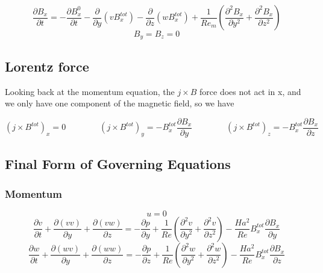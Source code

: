 \documentclass[11pt]{article}
\begin{document}
\begin{equation}
	\frac{\partial B_x}{\partial t} 
	=
	- \frac{\partial B_x^0}{\partial t}
	- \frac{\partial}{\partial y} (v B_x^{tot})
	- \frac{\partial}{\partial z} (w B_x^{tot})
	+ \frac{1}{Re_m}
	\left(
	\frac{\partial^2 B_x}{\partial y^2}
	+
	\frac{\partial^2 B_x}{\partial z^2}
	\right)
\end{equation}
\begin{equation}
	B_y = B_z = 0
\end{equation}

\subsection{Lorentz force}

Looking back at the momentum equation, the $j\times B$ force does not act in x, and we only have one component of the magnetic field, so we have

\begin{equation}
	(j \times B^{tot})_x = 0
	\qquad \qquad
	(j \times B^{tot})_y = - B_x^{tot} \frac{\partial B_x}{\partial y} 
	\qquad \qquad
	(j \times B^{tot})_z = - B_x^{tot} \frac{\partial B_x}{\partial z} 
\end{equation}

\subsection{Final Form of Governing Equations}

\subsubsection{Momentum}
\begin{equation}
	u=0
\end{equation}
\begin{equation}
	\frac{\partial v}{\partial t} 
	+ \frac{\partial (v v)}{\partial y}
	+ \frac{\partial (v w)}{\partial z}
	= 
	- \frac{\partial p}{\partial y}
	+ \frac{1}{Re}
	\left(
	\frac{\partial^2 v}{\partial y^2}
	+\frac{\partial^2 v}{\partial z^2}
	\right)
	- \frac{Ha^2}{Re}
	B_x^{tot} \frac{\partial B_x}{\partial y} 
\end{equation}
\begin{equation}
	\frac{\partial w}{\partial t} 
	+ \frac{\partial (w v)}{\partial y}
	+ \frac{\partial (w w)}{\partial z}
	= 
	- \frac{\partial p}{\partial z}
	+ \frac{1}{Re}
	\left(
	\frac{\partial^2 w}{\partial y^2}
	+\frac{\partial^2 w}{\partial z^2}
	\right)
	-\frac{Ha^2}{Re}
	B_x^{tot} \frac{\partial B_x}{\partial z}
\end{equation}
\end{document}
